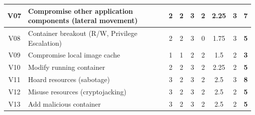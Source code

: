 \begin{landscape}
\begin{table}[]
{\begin{tabular}{|c|l|cccc|cc|c|}
V07             & Compromise other application components (lateral movement)                             & 2                                        & 2                              & 3                                        & 2                    & 2.25                                   & 3            & \textbf{7}           \\ \hline
V08             & Container breakout (R/W, Privilege Escalation)                                         & 2                                        & 2                              & 3                                        & 0                    & 1.75                                   & 3            & \textbf{5}           \\ \hline
V09             & Compromise local image cache                                                           & 1                                        & 1                              & 2                                        & 2                    & 1.5                                    & 2            & \textbf{3}           \\ \hline
V10             & Modify running container                                                               & 2                                        & 2                              & 3                                        & 2                    & 2.25                                   & 2            & \textbf{5}           \\ \hline
V11             & Hoard resources (sabotage)                                                             & 3                                        & 2                              & 3                                        & 2                    & 2.5                                    & 3            & \textbf{8}           \\ \hline
V12             & Misuse resources (cryptojacking)                                                       & 3                                        & 2                              & 3                                        & 2                    & 2.5                                    & 2            & \textbf{5}           \\ \hline
V13             & Add malicious container                                                                & 3                                        & 2                              & 3                                        & 2                    & 2.5                                    & 2            & \textbf{5}           \\ \hline

\end{tabular}}
\end{table}
\end{landscape}
